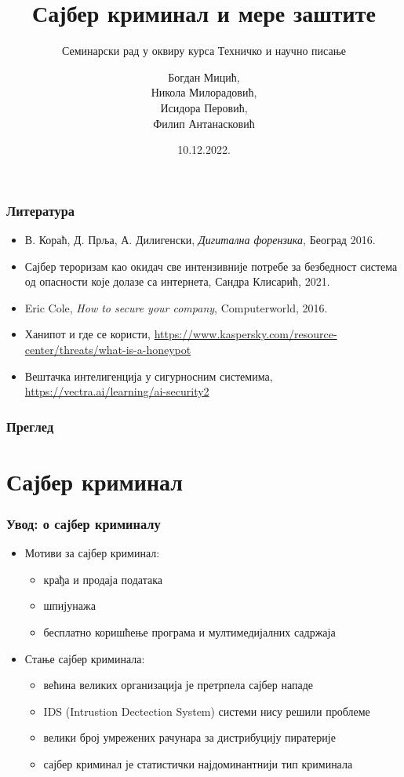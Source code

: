 \documentclass{beamer}
\title{Сајбер криминал и мере заштите}
\subtitle{Семинарски рад у оквиру курса Техничко и научно писање}
\author{Богдан Мицић, \\Никола Милорадовић, \\Исидора Перовић, \\Филип Антанасковић}
\institute{Математички факултет\\Универзитет у Београду}
\date{
  \footnotesize{10.12.2022.}
}
\begin{document}
\begin{frame}
  \thispagestyle{empty}
  \titlepage{}
\end{frame}
\addtocounter{framenumber}{-1}

\begin{frame}[fragile]\frametitle{Литература}
  \begin{itemize}
    \item В. Кораћ, Д. Прља, А. Дилигенски, \emph{Дигитална форензика}, Београд 2016.
    \item Сајбер тероризам као окидач све интензивније потребе за безбедност система од опасности које долазе са интернета, Сандра Клисарић, 2021.
    \item Eric Cole, \emph{How to secure your company}, Computerworld, 2016.
    \item Ханипот и где се користи, \url{https://www.kaspersky.com/resource-center/threats/what-is-a-honeypot}
    \item Вештачка интелигенција у сигурносним системима, \url{https://vectra.ai/learning/ai-security2}
  \end{itemize}
\end{frame}

\begin{frame}
	\frametitle{Преглед}
	\tableofcontents
\end{frame}
\section{Сајбер криминал}

\begin{frame}\frametitle{Увод: о сајбер криминалу}
  \begin{itemize}
    \item Мотиви за сајбер криминал:
    \begin{itemize}
      \item крађа и продаја података
      \item шпијунажа
      \item бесплатно коришћење програма и мултимедијалних садржаја
    \end{itemize}
    \item Стање сајбер криминала:
    \begin{itemize}
      \item већина великих организација је претрпела сајбер нападе
      \item IDS (Intrustion Dectection System) системи нису решили проблеме
      \item велики број умрежених рачунара за дистрибуцију пиратерије
      \item сајбер криминал је статистички најдоминантнији тип криминала
    \end{itemize}
  \end{itemize}
\end{frame}
\end{document}
